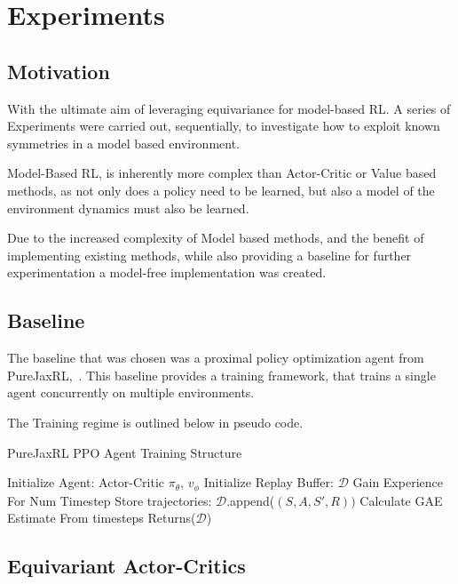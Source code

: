 \chapter{Experiments}
\section{Motivation}
With the ultimate aim of leveraging equivariance for model-based RL. A series of Experiments were carried out, sequentially, to investigate how to exploit known symmetries in a model based environment.

Model-Based RL, is inherently more complex than Actor-Critic or Value based methods, as not only does a policy need to be learned, but also a model of the environment dynamics must also be learned.

Due to the increased complexity of Model based methods, and the benefit of implementing existing methods, while also providing a baseline for further experimentation a model-free implementation was created.

\section{Baseline}
The baseline that was chosen was a proximal policy optimization agent from PureJaxRL,~\cite{lu2022discovered}. This baseline provides a training framework, that trains a single agent concurrently on multiple environments.

The Training regime is outlined below in pseudo code.
\begin{algorithm}
	\caption{PureJaxRL PPO Agent Training Structure}
	\begin{algorithmic}
		\State Initialize Agent: Actor-Critic $\pi_\theta$, $v_\phi$
		\State Initialize Replay Buffer: $\mathcal{D}$
		\State Gain Experience For Num Timestep
		\State Store trajectories: $\mathcal{D}$.append($(S, A, S', R))$
		\State Calculate GAE Estimate From timesteps
		\EndFor
		\EndFor
		\State Returns($\mathcal{D}$)

	\end{algorithmic}
\end{algorithm}

\section{Equivariant Actor-Critics}
